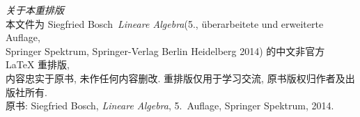 \begin{titlepage}
\vfill

\cleardoublepage
\end{titlepage}

\thispagestyle{empty}
\begin{center}
    \small
    \noindent\emph{关于本重排版}\\[0.5em]
    本文件为 Siegfried Bosch\ \emph{Lineare Algebra}(5., überarbeitete und erweiterte Auflage,\\
    Springer Spektrum, Springer-Verlag Berlin Heidelberg 2014)
    的中文非官方 \LaTeX{} 重排版,\\
    内容忠实于原书, 未作任何内容删改.
    重排版仅用于学习交流, 原书版权归作者及出版社所有.\\
    \vspace{0.5cm}
    原书: Siegfried Bosch, \textit{Lineare Algebra}, 5.\ Auflage, Springer Spektrum, 2014.
\end{center}
\clearpage
